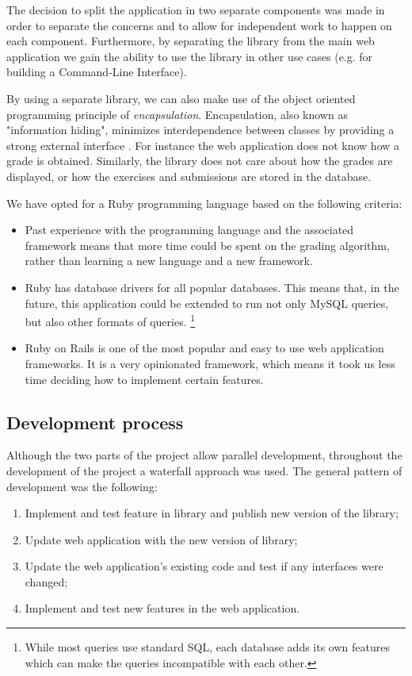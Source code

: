 The decision to split the application in two separate components was made in order to separate the concerns and to allow for independent work to happen on each component. Furthermore, by separating the library from the main web application we gain the ability to use the library in other use cases (e.g. for building a Command-Line Interface).

By using a separate library, we can also make use of the object oriented programming principle of \textit{encapsulation}. Encapsulation, also known as "information hiding", minimizes interdependence between classes by providing a strong external interface \citep{Encapsulation}. For instance the web application does not know how a grade is obtained. Similarly, the library does not care about how the grades are displayed, or how the exercises and submissions are stored in the database.

We have opted for a Ruby programming language based on the following criteria:

\begin{itemize}
    \item Past experience with the programming language and the associated framework means that more time could be spent on the grading algorithm, rather than learning a new language and a new framework.
    \item Ruby has database drivers for all popular databases. This means that, in the future, this application could be extended to run not only MySQL queries, but also other formats of queries. \footnote{While most queries use standard SQL, each database adds its own features which can make the queries incompatible with each other.}
    \item Ruby on Rails is one of the most popular and easy to use web application frameworks. It is a very opinionated framework, which means it took us less time deciding how to implement certain features.
\end{itemize}

\subsection{Development process} \label{ch:reqandspec:sec:spec:subsec:dev_process}

Although the two parts of the project allow parallel development, throughout the development of the project a waterfall approach was used. The general pattern of development was the following:

\begin{enumerate}
  \item Implement and test feature in library and publish new version of the library;
  \item Update web application with the new version of library;
  \item Update the web application's existing code and test if any interfaces were changed;
  \item Implement and test new features in the web application.
\end{enumerate}

